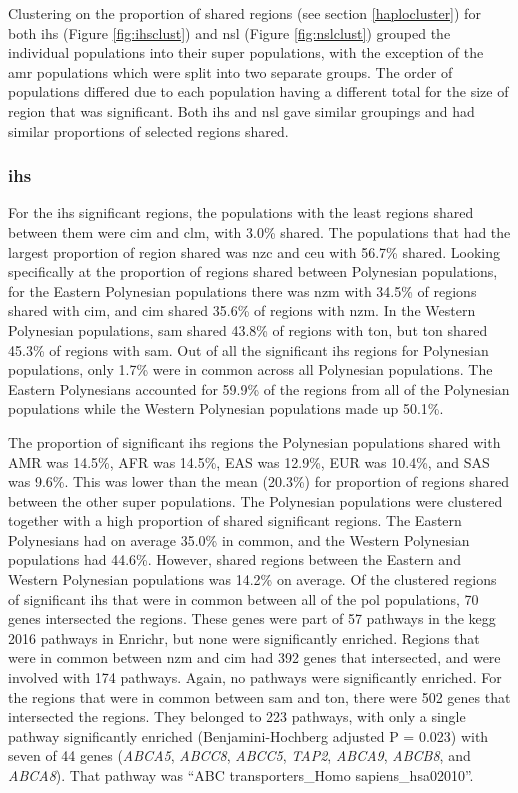 \documentclass[twoside,openright]{report}
\begin{document}
Clustering on the proportion of shared regions (see section
\ref{haplocluster}) for both \gls{ihs} (Figure \ref{fig:ihsclust}) and
\gls{nsl} (Figure \ref{fig:nslclust}) grouped the individual populations
into their super populations, with the exception of the \gls{amr}
populations which were split into two separate groups. The order of
populations differed due to each population having a different total for
the size of region that was significant. Both \gls{ihs} and \gls{nsl}
gave similar groupings and had similar proportions of selected regions
shared.

\subsubsection{\texorpdfstring{\gls{ihs}}{}}\label{section}

For the \gls{ihs} significant regions, the populations with the least
regions shared between them were \gls{cim} and \gls{clm}, with 3.0\%
shared. The populations that had the largest proportion of region shared
was \gls{nzc} and \gls{ceu} with 56.7\% shared. Looking specifically at
the proportion of regions shared between Polynesian populations, for the
Eastern Polynesian populations there was \gls{nzm} with 34.5\% of
regions shared with \gls{cim}, and \gls{cim} shared 35.6\% of regions
with \gls{nzm}. In the Western Polynesian populations, \gls{sam} shared
43.8\% of regions with \gls{ton}, but \gls{ton} shared 45.3\% of regions
with \gls{sam}. Out of all the significant \gls{ihs} regions for
Polynesian populations, only 1.7\% were in common across all Polynesian
populations. The Eastern Polynesians accounted for 59.9\% of the regions
from all of the Polynesian populations while the Western Polynesian
populations made up 50.1\%.

The proportion of significant \gls{ihs} regions the Polynesian
populations shared with AMR was 14.5\%, AFR was 14.5\%, EAS was 12.9\%,
EUR was 10.4\%, and SAS was 9.6\%. This was lower than the mean (20.3\%)
for proportion of regions shared between the other super populations.
The Polynesian populations were clustered together with a high
proportion of shared significant regions. The Eastern Polynesians had on
average 35.0\% in common, and the Western Polynesian populations had
44.6\%. However, shared regions between the Eastern and Western
Polynesian populations was 14.2\% on average. Of the clustered regions
of significant \gls{ihs} that were in common between all of the
\gls{pol} populations, 70 genes intersected the regions. These genes
were part of 57 pathways in the \gls{kegg} 2016 pathways in Enrichr, but
none were significantly enriched. Regions that were in common between
\gls{nzm} and \gls{cim} had 392 genes that intersected, and were
involved with 174 pathways. Again, no pathways were significantly
enriched. For the regions that were in common between \gls{sam} and
\gls{ton}, there were 502 genes that intersected the regions. They
belonged to 223 pathways, with only a single pathway significantly
enriched (Benjamini-Hochberg adjusted P = 0.023) with seven of 44 genes
(\emph{ABCA5}, \emph{ABCC8}, \emph{ABCC5}, \emph{TAP2}, \emph{ABCA9},
\emph{ABCB8}, and \emph{ABCA8}). That pathway was ``ABC
transporters\_Homo sapiens\_hsa02010''.
\end{document}
